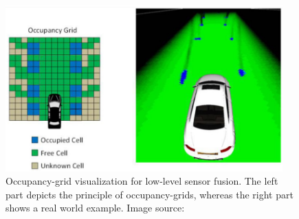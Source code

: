 \begin{figure}[t!]
	\centering
	\includegraphics[width=0.95\textwidth]{imgs/occupancy_grid_principle.png}
    \caption{Occupancy-grid visualization for low-level sensor fusion. The left part depicts the principle of occupancy-grids, whereas the right part shows a real world example. Image source: \textcite{Hohm2014}}
	\label{fig:occupancy-grid}
\end{figure}

